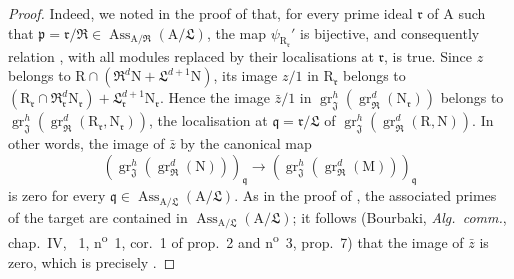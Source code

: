 \begin{proof}
Indeed, we noted in the proof of  that, for every prime ideal $\mathfrak{r}$ of $\mathrm{A}$ such that $\mathfrak{p}=\mathfrak{r}/\mathfrak{R}\in\operatorname{Ass}_{\mathrm{A}/\mathfrak{R}}(\mathrm{A}/\mathfrak{L})$, the map $\psi_{\mathrm{R}_\mathfrak{r}}'$ is bijective, and consequently relation , with all modules replaced by their localisations at $\mathfrak{r}$, is true. Since $z$ belongs to $\mathrm{R}\cap(\mathfrak{R}^d\mathrm{N}+\mathfrak{L}^{d+1}\mathrm{N})$, its image $z/1$ in $\mathrm{R}_\mathfrak{r}$ belongs to $(\mathrm{R}_\mathfrak{r}\cap\mathfrak{R}_\mathfrak{r}^d\mathrm{N}_\mathfrak{r})+\mathfrak{L}_\mathfrak{r}^{d+1}\mathrm{N}_\mathfrak{r}$. Hence the image $\bar{z}/1$ in $\operatorname{gr}_\mathfrak{J}^{h}(\operatorname{gr}_\mathfrak{R}^{d}(\mathrm{N}_\mathfrak{r}))$ belongs to $\operatorname{gr}_\mathfrak{J}^{h}(\operatorname{gr}_\mathfrak{R}^{d}(\mathrm{R}_\mathfrak{r},\mathrm{N}_\mathfrak{r}))$, the localisation at $\mathfrak{q}=\mathfrak{r}/\mathfrak{L}$ of $\operatorname{gr}_\mathfrak{J}^{h}(\operatorname{gr}_\mathfrak{R}^{d}(\mathrm{R},\mathrm{N}))$. In other words, the image of $\bar{z}$ by the canonical map
\[
  (\operatorname{gr}_\mathfrak{J}^{h}(\operatorname{gr}_\mathfrak{R}^{d}(\mathrm{N})))_\mathfrak{q}
  \longrightarrow
  (\operatorname{gr}_\mathfrak{J}^{h}(\operatorname{gr}_\mathfrak{R}^{d}(\mathrm{M})))_\mathfrak{q}
\]
is zero for every $\mathfrak{q}\in\operatorname{Ass}_{\mathrm{A}/\mathfrak{L}}(\mathrm{A}/\mathfrak{L})$. As in the proof of , the associated primes of the target are contained in $\operatorname{Ass}_{\mathrm{A}/\mathfrak{L}}(\mathrm{A}/\mathfrak{L})$; it follows (Bourbaki, \emph{Alg.~comm.}, chap.~IV, \textsection~1, n\textsuperscript{o}~1, cor.~1 of prop.~2 and n\textsuperscript{o}~3, prop.~7) that the image of $\bar{z}$ is zero, which is precisely .


\end{proof}
